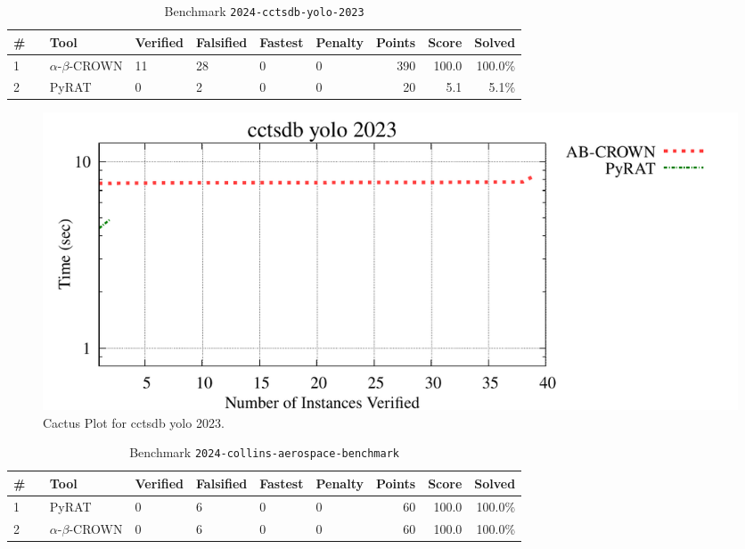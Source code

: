 
\clearpage

\begin{table}[h]
\begin{center}
\caption{Benchmark \texttt{2024-cctsdb-yolo-2023}} \label{tab:cat_{cat}}
{\setlength{\tabcolsep}{2pt}
\begin{tabular}[h]{@{}llllllrrr@{}}
\toprule
\textbf{\# ~} & \textbf{Tool} & \textbf{Verified} & \textbf{Falsified} & \textbf{Fastest} & \textbf{Penalty} & \textbf{Points} & \textbf{Score} & \textbf{Solved}\\
\midrule
1 & $\alpha$-$\beta$-CROWN & 11 & 28 & 0 & 0 & 390 & 100.0 & 100.0\% \\
2 & PyRAT & 0 & 2 & 0 & 0 & 20 & 5.1 & 5.1\% \\
\bottomrule
\end{tabular}
}
\end{center}
\end{table}



\begin{figure}[h]
\centerline{\includegraphics[width=\textwidth]{cactus/2024_cctsdb_yolo_2023.pdf}}
\caption{Cactus Plot for cctsdb yolo 2023.}
\label{fig:quantPic}
\end{figure}


\clearpage

\begin{table}[h]
\begin{center}
\caption{Benchmark \texttt{2024-collins-aerospace-benchmark}} \label{tab:cat_{cat}}
{\setlength{\tabcolsep}{2pt}
\begin{tabular}[h]{@{}llllllrrr@{}}
\toprule
\textbf{\# ~} & \textbf{Tool} & \textbf{Verified} & \textbf{Falsified} & \textbf{Fastest} & \textbf{Penalty} & \textbf{Points} & \textbf{Score} & \textbf{Solved}\\
\midrule
1 & PyRAT & 0 & 6 & 0 & 0 & 60 & 100.0 & 100.0\% \\
2 & $\alpha$-$\beta$-CROWN & 0 & 6 & 0 & 0 & 60 & 100.0 & 100.0\% \\
\bottomrule
\end{tabular}
}
\end{center}
\end{table}



